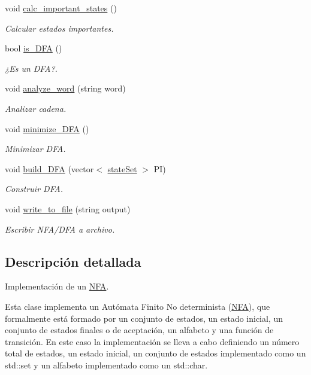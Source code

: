\begin{DoxyCompactItemize}
void \mbox{\hyperlink{class_n_f_a_addc2cae46439f77116f37230ec8a90d0}{calc\+\_\+important\+\_\+states}} ()
\begin{DoxyCompactList}\small\item\em Calcular estados importantes. \end{DoxyCompactList}\item 
bool \mbox{\hyperlink{class_n_f_a_ab96e6d2ab872971542e2565ceacf4b61}{is\+\_\+\+D\+FA}} ()
\begin{DoxyCompactList}\small\item\em ¿\+Es un D\+FA?. \end{DoxyCompactList}\item 
void \mbox{\hyperlink{class_n_f_a_a7cad5fd6ba765d9d8099793421100234}{analyze\+\_\+word}} (string word)
\begin{DoxyCompactList}\small\item\em Analizar cadena. \end{DoxyCompactList}\item 
void \mbox{\hyperlink{class_n_f_a_afe68583b823822777693018f69e1b6b0}{minimize\+\_\+\+D\+FA}} ()
\begin{DoxyCompactList}\small\item\em Minimizar D\+FA. \end{DoxyCompactList}\item 
void \mbox{\hyperlink{class_n_f_a_aaadda0fc1d4ebc279cbb25a8486a8b72}{build\+\_\+\+D\+FA}} (vector$<$ \mbox{\hyperlink{classstate_set}{state\+Set}} $>$ PI)
\begin{DoxyCompactList}\small\item\em Construir D\+FA. \end{DoxyCompactList}\item 
void \mbox{\hyperlink{class_n_f_a_ac7c80c0e89655abde2de1c7c8c37db5e}{write\+\_\+to\+\_\+file}} (string output)
\begin{DoxyCompactList}\small\item\em Escribir N\+F\+A/\+D\+FA a archivo. \end{DoxyCompactList}\end{DoxyCompactItemize}


\subsection{Descripción detallada}
Implementación de un \mbox{\hyperlink{class_n_f_a}{N\+FA}}. 

Esta clase implementa un Autómata Finito No determinista (\mbox{\hyperlink{class_n_f_a}{N\+FA}}), que formalmente está formado por un conjunto de estados, un estado inicial, un conjunto de estados finales o de aceptación, un alfabeto y una función de transición. En este caso la implementación se lleva a cabo definiendo un número total de estados, un estado inicial, un conjunto de estados implementado como un std\+::set y un alfabeto implementado como un std\+::char.

